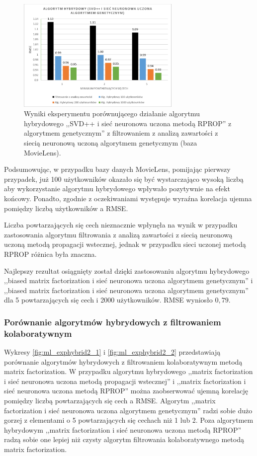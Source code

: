 \documentclass[twoside]{iisthesis}
\begin{document}
		\begin{figure}
			\centering
			\includegraphics[width=0.7\textwidth]{ml_exphybrid1_9}			
			\caption{Wyniki eksperymentu porównującego działanie algorytmu hybrydowego ,,SVD++ i sieć neuronowa uczona metodą RPROP'' z algorytmem genetycznym'' z filtrowaniem z analizą zawartości z siecią neuronową uczoną algorytmem genetycznym (baza MovieLens).}
			\label{fig:ml_exphybrid1_9}
		\end{figure}
	
		Podsumowując, w przypadku bazy danych MovieLens, pomijając pierwszy przypadek, już 100 użytkowników okazało się być wystarczająco wysoką liczbą aby wykorzystanie algorytmu hybrydowego wpływało pozytywnie na efekt końcowy. Ponadto, zgodnie z oczekiwaniami występuje wyraźna korelacja ujemna pomiędzy liczbą użytkowników a RMSE. 
		
		Liczba powtarzających się cech nieznacznie wpłynęła na wynik w przypadku zastosowania algorytmu filtrowania z analizą zawartości z siecią neuronową uczoną metodą propagacji wstecznej, jednak w przypadku sieci uczonej metodą RPROP różnica była znaczna. 
		
		Najlepszy rezultat osiągnięty został dzięki zastosowaniu algorytmu hybrydowego ,,biased matrix factorization i sieć neuronowa uczona algorytmem genetycznym'' i ,,biased matrix factorization i sieć neuronowa uczona algorytmem genetycznym'' dla 5 powtarzających się cech i 2000 użytkowników. RMSE wyniosło $0,79$.
		
		\subsubsection{Porównanie algorytmów hybrydowych z filtrowaniem kolaboratywnym}
		
		Wykresy \ref{fig:ml_exphybrid2_1} i \ref{fig:ml_exphybrid2_2} przedstawiają porównanie algorytmów hybrydowych z filtrowaniem kolaboratywnym metodą matrix factorization. W przypadku algorytmu hybrydowego ,,matrix factorization i sieć neuronowa uczona metodą propagacji wstecznej'' i ,,matrix factorization i sieć neuronowa uczona metodą RPROP'' można zaobserwować ujemną korelację pomiędzy liczbą powtarzających się cech a RMSE. Algorytm ,,matrix factorization i sieć neuronowa uczona algorytmem genetycznym'' radzi sobie dużo gorzej z elementami o 5 powtarzających się cechach niż 1 lub 2. Poza algorytmem hybrydowym ,,matrix factorization i sieć neuronowa uczona metodą RPROP'' radzą sobie one lepiej niż czysty algorytm filtrowania kolaboratywnego metodą matrix factorization.
		
\end{document}
